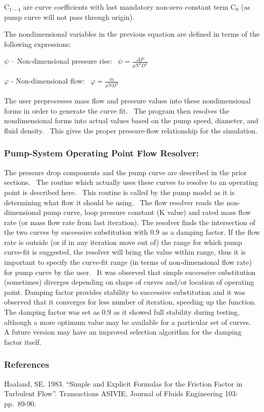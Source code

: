 C\(_{1-4}\) are curve coefficients with last mandatory non-zero constant term C\(_{0}\) (as pump curve will not pass through origin).

The nondimensional variables in the previous equation are defined in terms of the following expressions:

$\psi$ -- Non-dimensional pressure rise:~ \(\psi = \frac{{\Delta P}}{{\rho {N^2}{D^2}}}\)

$\varphi$ - Non-dimensional flow:~ \(\varphi = \frac{{\dot m}}{{\rho N{D^3}}}\)

The user preprocesses mass flow and pressure values into these nondimensional forms in order to generate the curve fit.~ The program then resolves the nondimensional forms into actual values based on the pump speed, diameter, and fluid density.~ This gives the proper pressure-flow relationship for the simulation.

\subsubsection{Pump-System Operating Point Flow Resolver:}\label{pump-system-operating-point-flow-resolver}

The pressure drop components and the pump curve are described in the prior sections.~ The routine which actually uses these curves to resolve to an operating point is described here.~ This routine is called by the pump model as it is determining what flow it should be using.~ The flow resolver reads the non-dimensional pump curve, loop pressure constant (K value) and rated mass flow rate (or mass flow rate from last iteration). The resolver finds the intersection of the two curves by successive substitution with 0.9 as a damping factor. If the flow rate is outside (or if in any iteration move out of) the range for which pump curve-fit is suggested, the resolver will bring the value within range, thus it is important to specify the curve-fit range (in terms of non-dimensional flow rate) for pump curve by the user.~ It was observed that simple successive substitution (sometimes) diverges depending on shape of curves and/or location of operating point. Damping factor provides stability to successive substitution and it was observed that it converges for less number of iteration, speeding up the function. The damping factor was set as 0.9 as it showed full stability during testing, although a more optimum value may be available for a particular set of curves.~ A future version may have an improved selection algorithm for the damping factor itself.

\subsubsection{References}\label{references-037}

Haaland, SE. 1983. ``Simple and Explicit Formulas for the Friction Factor in Turbulent Flow''. Transactions ASIVIE, Journal of Fluids Engineering 103: pp.~89-90.
